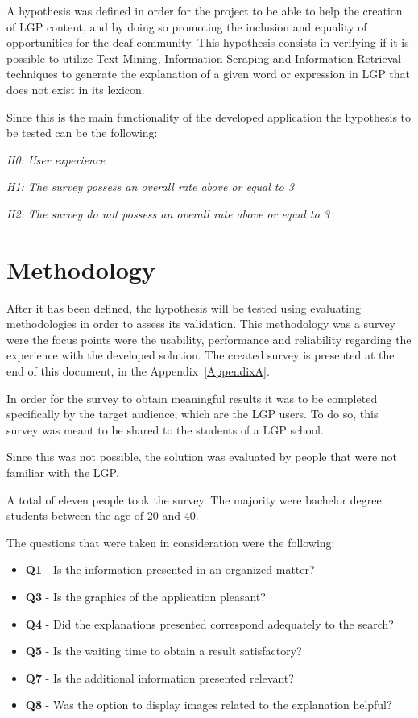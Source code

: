 A hypothesis was defined in order for the project to be able to help the creation of \gls{LGP} content, and by doing so promoting the inclusion and equality of opportunities for the deaf community.
This hypothesis consists in verifying if it is possible to utilize Text Mining\cite{gupta2009survey}, Information Scraping\cite{young2006method}\cite{rose2017automatically} and Information Retrieval\cite{baeza1999modern} techniques to generate the explanation of a given word or expression in \gls{LGP} that does not exist in its lexicon.

Since this is the main functionality of the developed application the hypothesis to be tested can be the following:
\begin{center}
    \emph{H0: User experience}

    \emph{H1: The survey possess an overall rate above or equal to 3}

    \emph{H2: The survey do not possess an overall rate above or equal to 3}
\end{center}

\section{Methodology}

After it has been defined, the hypothesis will be tested using evaluating methodologies in order to assess its validation.
This methodology was a survey were the focus points were the usability, performance and reliability regarding the experience with the developed solution.
The created survey is presented at the end of this document, in the Appendix~\ref{AppendixA}.

In order for the survey to obtain meaningful results it was to be completed specifically by the target audience, which are the \gls{LGP} users.
To do so, this survey was meant to be shared to the students of a \gls{LGP} school.

Since this was not possible, the solution was evaluated by people that were not familiar with the \gls{LGP}.

A total of eleven people took the survey.
The majority were bachelor degree students between the age of 20 and 40.

The questions that were taken in consideration were the following:
\begin{itemize}
    \item \textbf{Q1} - Is the information presented in an organized matter?
    \item \textbf{Q3} - Is the graphics of the application pleasant?
    \item \textbf{Q4} - Did the explanations presented correspond adequately to the search?
    \item \textbf{Q5} - Is the waiting time to obtain a result satisfactory?
    \item \textbf{Q7} - Is the additional information presented relevant?
    \item \textbf{Q8} - Was the option to display images related to the explanation helpful?
\end{itemize}

